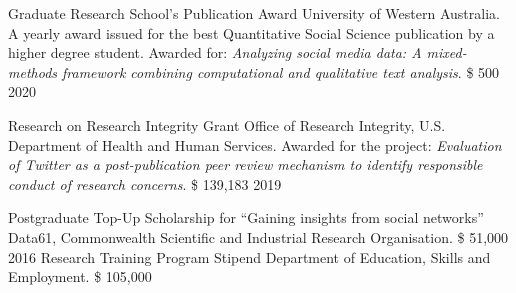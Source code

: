 \begin{cvhonors}
    \cvhonor
    {Graduate Research School’s Publication Award}
    {University of Western Australia.\linebreak
    A yearly award issued for the best Quantitative Social Science publication by a higher degree student.
    Awarded for: \textit{Analyzing social media data: A mixed-methods framework combining computational and qualitative text analysis}.} %
    {\$ 500} %
    {2020} %
\end{cvhonors}
\begin{cvhonors}
  \cvhonor
    {Research on Research Integrity Grant} %
    {Office of Research Integrity, U.S. Department of Health and Human Services.\linebreak
    Awarded for the project: \textit{Evaluation of Twitter as a post-publication peer review mechanism to identify responsible conduct of research concerns}.
    }
    {\$ 139,183} %
    {2019} %
\end{cvhonors}
\begin{cvhonors}
  \cvhonor
    {Postgraduate Top-Up Scholarship for ``Gaining insights from social networks''} %
    {Data61, Commonwealth Scientific and Industrial Research Organisation.} %
    {\$ 51,000} %
    {2016} %
  \cvhonor
    {Research Training Program Stipend} %
    {Department of Education, Skills and Employment.} %
    {\$ 105,000} %
    {} %
\end{cvhonors}

